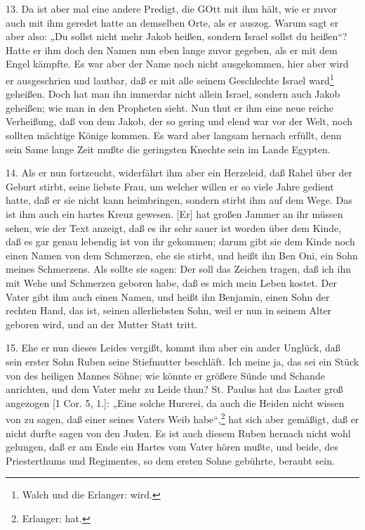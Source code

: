 13. Da ist aber mal eine andere Predigt, die GOtt mit ihm hält, wie er zuvor auch mit ihm geredet hatte an demselben Orte, als er auszog. Warum sagt er aber also: „Du sollst nicht mehr Jakob heißen, sondern Israel sollst du heißen“? Hatte er ihm doch den Namen nun eben lange zuvor gegeben, als er mit dem Engel kämpfte. Es war aber der Name noch nicht ausgekommen, hier aber wird er ausgeschrien und lautbar, daß er mit alle seinem Geschlechte Israel ward\footnote{Walch und die Erlanger: wird.} geheißen. Doch hat man ihn immerdar nicht allein Israel, sondern auch Jakob geheißen; wie man in den Propheten sieht. Nun thut er ihm eine neue reiche Verheißung, daß von dem Jakob, der so gering und elend war vor der Welt, noch sollten mächtige Könige kommen. Es ward aber langsam hernach erfüllt, denn sein Same lange Zeit mußte die geringsten Knechte sein im Lande Egypten.

14. Als er nun fortzeucht, widerfährt ihm aber ein Herzeleid, daß Rahel über der Geburt stirbt, seine liebste Frau, um welcher willen er so viele Jahre gedient hatte, daß er sie nicht kann heimbringen, sondern stirbt ihm auf dem Wege. Das ist ihm auch ein hartes Kreuz gewesen. [Er] hat großen Jammer an ihr müssen sehen, wie der Text anzeigt, daß es ihr sehr sauer ist worden über dem Kinde, daß es gar genau lebendig ist von ihr gekommen; darum gibt sie dem Kinde noch einen Namen von dem Schmerzen, ehe sie stirbt, und heißt ihn Ben Oni, ein Sohn meines Schmerzens. Als sollte sie sagen: Der soll das Zeichen tragen, daß ich ihn mit Wehe und Schmerzen geboren habe, daß es mich mein Leben kostet. Der Vater gibt ihm auch einen Namen, und heißt ihn Benjamin, einen Sohn der rechten Hand, das ist, seinen allerliebsten Sohn, weil er nun in seinem Alter geboren wird, und an der Mutter Statt tritt.

15. Ehe er nun dieses Leides vergißt, kommt ihm aber ein ander Unglück, daß sein erster Sohn Ruben seine Stiefmutter beschläft. Ich meine ja, das sei ein Stück von des heiligen Mannes Söhne; wie könnte er größere Sünde und Schande anrichten, und dem Vater mehr zu Leide thun? St. Paulus hat das Laster groß angezogen [1 Cor. 5, 1.]: „Eine solche Hurerei, da auch die Heiden nicht wissen von zu sagen, daß einer seines Vaters Weib habe“,\footnote{Erlanger: hat.} hat sich aber gemäßigt, daß er nicht durfte sagen von den Juden. Es ist auch diesem Ruben hernach nicht wohl gelungen, daß er am Ende ein Hartes vom Vater hören mußte, und beide, des Priesterthums und Regimentes, so dem ersten Sohne gebührte, beraubt sein.

